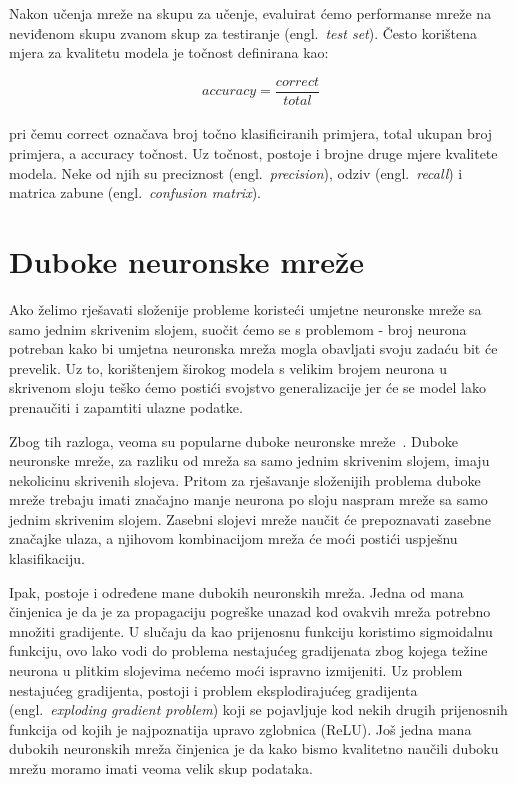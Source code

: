 \documentclass[times, utf8, zavrsni, numeric]{fer}
\begin{document}
Nakon učenja mreže na skupu za učenje, evaluirat ćemo performanse mreže na neviđenom skupu zvanom skup za testiranje (engl.\ \textit{test set}). Često korištena mjera za kvalitetu modela je točnost definirana kao:

\begin{equation}
    accuracy = \frac{correct}{total}
    \label{eq:accuracy}
\end{equation}
\\
pri čemu correct označava broj točno klasificiranih primjera, total ukupan broj primjera, a accuracy točnost.
Uz točnost, postoje i brojne druge mjere kvalitete modela. Neke od njih su preciznost (engl.\ \textit{precision}), odziv (engl.\ \textit{recall}) i matrica zabune (engl.\ \textit{confusion matrix}).

\section{Duboke neuronske mreže}
Ako želimo rješavati složenije probleme koristeći umjetne neuronske mreže sa samo jednim skrivenim slojem, suočit ćemo se s problemom - broj neurona potreban kako bi umjetna neuronska mreža mogla obavljati svoju zadaću bit će prevelik.
Uz to, korištenjem širokog modela s velikim brojem neurona u skrivenom sloju teško ćemo postići svojstvo generalizacije jer će se model lako prenaučiti i zapamtiti ulazne podatke. 

Zbog tih razloga, veoma su popularne duboke neuronske mreže~\cite{Goodfellow-et-al-2016}. Duboke neuronske mreže, za razliku od mreža sa samo jednim skrivenim slojem, imaju nekolicinu skrivenih slojeva. 
Pritom za rješavanje složenijih problema duboke mreže trebaju imati značajno manje neurona po sloju naspram mreže sa samo jednim skrivenim slojem. 
Zasebni slojevi mreže naučit će prepoznavati zasebne značajke ulaza, a njihovom kombinacijom mreža će moći postići uspješnu klasifikaciju.

Ipak, postoje i određene mane dubokih neuronskih mreža. Jedna od mana činjenica je da je za propagaciju pogreške unazad kod ovakvih mreža potrebno množiti gradijente. 
U slučaju da kao prijenosnu funkciju koristimo sigmoidalnu funkciju, ovo lako vodi do problema nestajućeg gradijenata zbog kojega težine neurona u plitkim slojevima nećemo moći ispravno izmijeniti.
Uz problem nestajućeg gradijenta, postoji i problem eksplodirajućeg gradijenta (engl.\ \textit{exploding gradient problem}) koji se pojavljuje kod nekih drugih prijenosnih funkcija od kojih je najpoznatija upravo zglobnica (ReLU).
Još jedna mana dubokih neuronskih mreža činjenica je da kako bismo kvalitetno naučili duboku mrežu moramo imati veoma velik skup podataka.
\end{document}
